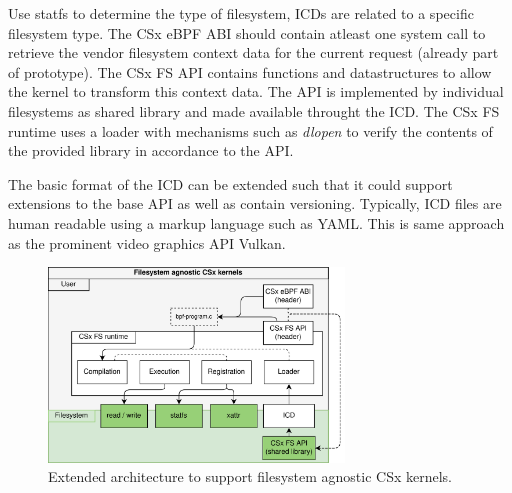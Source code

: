 Use statfs to determine the type of filesystem, ICDs are related to a specific
filesystem type. The CSx eBPF ABI should contain atleast one system call to
retrieve the vendor filesystem context data for the current request (already
part of prototype). The CSx FS API contains functions and datastructures to
allow the kernel to transform this context data. The API is implemented by
individual filesystems as shared library and made available throught the ICD.
The CSx FS runtime uses a loader with mechanisms such as \textit{dlopen} to
verify the contents of the provided library in accordance to the API.

The basic format of the ICD can be extended such that it could support
extensions to the base API as well as contain versioning. Typically, ICD files
are human readable using a markup language such as YAML. This is same approach
as the prominent video graphics API Vulkan.

\begin{figure}
    \centering
	\includegraphics[width=0.7\textwidth]{resources/images/csx-fs-agnostic.png}
	\caption{Extended architecture to support filesystem agnostic CSx kernels.}
    \label{figure:csxfsruntime}
\end{figure}


